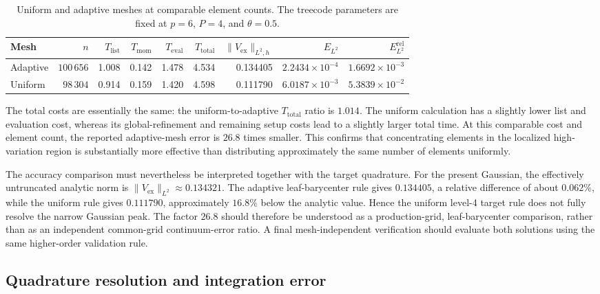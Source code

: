 \documentclass[a4paper,10pt]{article}
\begin{document}
\begin{table}[H]
\centering
\small
\caption{Uniform and adaptive meshes at comparable element counts.  The
treecode parameters are fixed at \(p=6\), \(P=4\), and \(\theta=0.5\).}
\label{tab:uniform_adaptive_comparison}
\begin{tabular}{lrrrrrrrr}
\toprule
Mesh & \(n\) & \(T_{\mathrm{list}}\) &
\(T_{\mathrm{mom}}\) & \(T_{\mathrm{eval}}\) &
\(T_{\mathrm{total}}\) &
\(\|V_{\mathrm{ex}}\|_{L^2,h}\) &
\(E_{L^2}\) & \(E_{L^2}^{\mathrm{rel}}\)\\
\midrule
Adaptive &
\(100\,656\) & 1.008 & 0.142 & 1.478 & 4.534 &
0.134405 & \(2.2434\times10^{-4}\) & \(1.6692\times10^{-3}\)\\
Uniform &
\(98\,304\) & 0.914 & 0.159 & 1.420 & 4.598 &
0.111790 & \(6.0187\times10^{-3}\) & \(5.3839\times10^{-2}\)\\
\bottomrule
\end{tabular}
\end{table}

The total costs are essentially the same: the uniform-to-adaptive
\(T_{\mathrm{total}}\) ratio is \(1.014\).  The uniform calculation has a
slightly lower list and evaluation cost, whereas its global-refinement and
remaining setup costs lead to a slightly larger total time.  At this
comparable cost and element count, the reported adaptive-mesh error is
\(26.8\) times smaller.  This confirms that concentrating elements in the
localized high-variation region is substantially more effective than
distributing approximately the same number of elements uniformly.

The accuracy comparison must nevertheless be interpreted together with the
target quadrature.  For the present Gaussian, the effectively untruncated
analytic norm is \(\|V_{\mathrm{ex}}\|_{L^2}\approx0.134321\).  The adaptive
leaf-barycenter rule gives \(0.134405\), a relative difference of about
\(0.062\%\), while the uniform rule gives \(0.111790\), approximately
\(16.8\%\) below the analytic value.  Hence the uniform level-4 target rule
does not fully resolve the narrow Gaussian peak.  The factor \(26.8\) should
therefore be understood as a production-grid, leaf-barycenter comparison,
rather than as an independent common-grid continuum-error ratio.  A final
mesh-independent verification should evaluate both solutions using the same
higher-order validation rule.


\subsection{Quadrature resolution and integration error}
\end{document}
